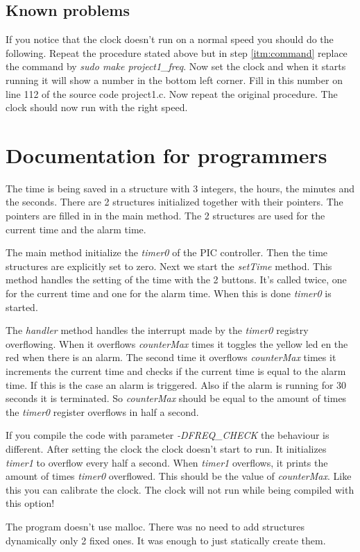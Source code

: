 \documentclass[a4]{article}
\begin{document}
\subsection{Known problems}
If you notice that the clock doesn't run on a normal speed you should do the following. Repeat the procedure stated above but in step \ref{itm:command} replace the command by \textit{sudo make project1\_freq}. Now set the clock and when it starts running it will show a number in the bottom left corner. Fill in this number on line 112 of the source code project1.c. Now repeat the original procedure. The clock should now run with the right speed.
\section{Documentation for programmers}
The time is being saved in a structure with 3 integers, the hours, the minutes and the seconds. There are 2 structures initialized together with their pointers. The pointers are filled in in the main method. The 2 structures are used for the current time and the alarm time.\par
The main method initialize the \textit{timer0} of the PIC controller. Then the time structures are explicitly set to zero. Next we start the \textit{setTime} method. This method handles the setting of the time with the 2 buttons. It's called twice, one for the current time and one for the alarm time. When this is done \textit{timer0} is started.\par
The \textit{handler} method handles the interrupt made by the \textit{timer0} registry overflowing. When it overflows \textit{counterMax} times it toggles the yellow led en the red when there is an alarm. The second time it overflows \textit{counterMax} times it increments the current time and checks if the current time is equal to the alarm time. If this is the case an alarm is triggered. Also if the alarm is running for 30 seconds it is terminated. So \textit{counterMax} should be equal to the amount of times the \textit{timer0} register overflows in half a second.\par
If you compile the code with parameter \textit{-DFREQ\_CHECK} the behaviour is different. After setting the clock the clock doesn't start to run. It initializes \textit{timer1} to overflow every half a second. When \textit{timer1} overflows, it prints the amount of times \textit{timer0} overflowed. This should be the value of \textit{counterMax}. Like this you can calibrate the clock. The clock will not run while being compiled with this option!\par
The program doesn't use malloc. There was no need to add structures dynamically only 2 fixed ones. It was enough to just statically create them.
\end{document}
